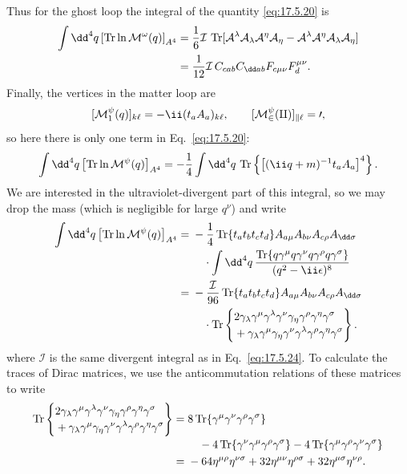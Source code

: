 Thus for the ghost loop the integral of the quantity \eqref{eq:17.5.20} is
\begin{align}
\int \dd^4q\left[\operatorname{Tr}\ln\mathcal M^\omega(q)\right]_{A^4}
={}&\frac16\mathcal I\,\operatorname{Tr}
[\mathcal A^\lambda\mathcal A_\lambda\mathcal A^\eta\mathcal A_\eta
-\mathcal A^\lambda\mathcal A^\eta\mathcal A_\lambda\mathcal A_\eta]
\notag\\
={}&\frac1{12}\mathcal I\,C_{cab}C_{\dd ab}
F_{c\mu\nu}F_d^{\mu\nu}.
\label{eq:17.5.28}
\end{align}
Finally, the vertices in the matter loop are
\[
[\mathcal M_1^\psi(q)]_{k\ell}=-\ii(t_a\sl A_a)_{k\ell},
\qquad
[\mathcal M_2^\psi(q)]_{k\ell}=0,
\]
so here there is only one term in Eq.~\eqref{eq:17.5.20}:
\[
\int \dd^4q\left[\operatorname{Tr}\ln\mathcal M^\psi(q)\right]_{A^4}
=-\frac14\int \dd^4q\,\operatorname{Tr}
\left\{\left[(\ii\sl q+m)^{-1}t_a\sl A_a\right]^4\right\}.
\]
We are interested in the ultraviolet-divergent part of this integral, so we
may drop the mass (which is negligible for large $q^\nu$) and write
\begin{align}
\int \dd^4q\left[\operatorname{Tr}\ln\mathcal M^\psi(q)\right]_{A^4}
={}&-\frac14\operatorname{Tr}\{t_a t_b t_c t_d\}
A_{a\mu}A_{b\nu}A_{c\rho}A_{\dd\sigma}
\notag\\[-2pt]
&\quad\cdot
\int \dd^4q\,
\frac{\operatorname{Tr}\{\sl q\gamma^\mu\sl q\gamma^\nu
\sl q\gamma^\rho\sl q\gamma^\sigma\}}{(q^2-\ii\epsilon)^8}
\notag\\
={}&-\frac{\mathcal I}{96}\operatorname{Tr}\{t_a t_b t_c t_d\}
A_{a\mu}A_{b\nu}A_{c\rho}A_{\dd\sigma}
\notag\\
&\quad\cdot\operatorname{Tr}\left\{
\begin{aligned}
&2\gamma_\lambda\gamma^\mu\gamma^\lambda\gamma^\nu
 \gamma_\eta\gamma^\rho\gamma^\eta\gamma^\sigma\\[-2pt]
&+\gamma_\lambda\gamma^\mu\gamma_\eta\gamma^\nu
 \gamma^\lambda\gamma^\rho\gamma^\eta\gamma^\sigma
\end{aligned}\right\}.
\label{eq:17.5.29}
\end{align}
where $\mathcal I$ is the same divergent integral as in Eq.~\eqref{eq:17.5.24}.
To calculate the traces of Dirac matrices, we use the anticommutation
relations of these matrices to write
\begin{align*}
\operatorname{Tr}\left\{\begin{aligned}
&2\gamma_\lambda\gamma^\mu\gamma^\lambda\gamma^\nu
 \gamma_\eta\gamma^\rho\gamma^\eta\gamma^\sigma\\[-2pt]
&+\gamma_\lambda\gamma^\mu\gamma_\eta\gamma^\nu
 \gamma^\lambda\gamma^\rho\gamma^\eta\gamma^\sigma
\end{aligned}\right\}
={}&8\operatorname{Tr}\{\gamma^\mu\gamma^\nu\gamma^\rho\gamma^\sigma\}
\notag\\[-2pt]
&\quad-4\operatorname{Tr}\{\gamma^\nu\gamma^\mu\gamma^\rho\gamma^\sigma\}
-4\operatorname{Tr}\{\gamma^\mu\gamma^\rho\gamma^\nu\gamma^\sigma\}\\
={}&-64\eta^{\mu\rho}\eta^{\nu\sigma}
+32\eta^{\mu\nu}\eta^{\rho\sigma}
+32\eta^{\mu\sigma}\eta^{\nu\rho}.
\end{align*}
